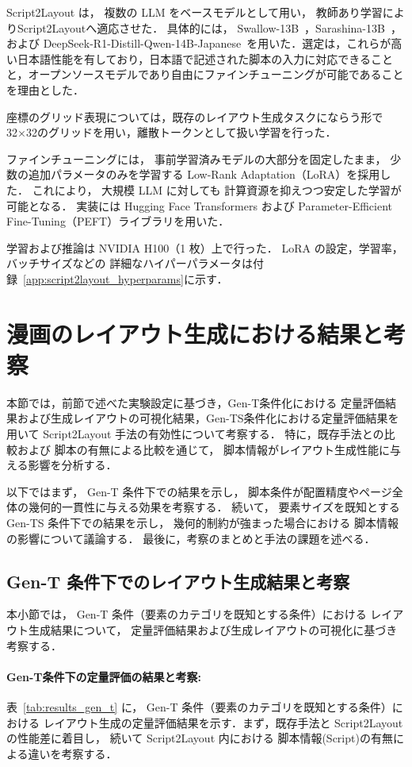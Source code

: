 \documentclass[a4j,12pt,dvipdfmx]{jsreport}
\begin{document}
Script2Layout は，
複数の LLM をベースモデルとして用い，
教師あり学習によりScript2Layoutへ適応させた．
具体的には，
Swallow-13B~\cite{fujii2024swallow}，Sarashina-13B~\cite{sarashina13b}，
および DeepSeek-R1-Distill-Qwen-14B-Japanese~\cite{deepseek2024r1,bai2023qwen}を用いた．選定は，これらが高い日本語性能を有しており，日本語で記述された脚本の入力に対応できることと，オープンソースモデルであり自由にファインチューニングが可能であることを理由とした．

座標のグリッド表現については，既存のレイアウト生成タスクにならう形で32×32のグリッドを用い，離散トークンとして扱い学習を行った．

ファインチューニングには，
事前学習済みモデルの大部分を固定したまま，
少数の追加パラメータのみを学習する
Low-Rank Adaptation（LoRA）を採用した．
これにより，
大規模 LLM に対しても
計算資源を抑えつつ安定した学習が可能となる．
実装には Hugging Face Transformers および
Parameter-Efficient Fine-Tuning（PEFT）ライブラリを用いた．

学習および推論は NVIDIA H100（1 枚）上で行った．
LoRA の設定，学習率，バッチサイズなどの
詳細なハイパーパラメータは付録~\ref{app:script2layout_hyperparams}に示す．

\section{漫画のレイアウト生成における結果と考察}\label{sec:results}

本節では，前節で述べた実験設定に基づき，Gen-T条件化における
定量評価結果および生成レイアウトの可視化結果，Gen-TS条件化における定量評価結果を用いて
Script2Layout 手法の有効性について考察する．
特に，既存手法との比較および
脚本の有無による比較を通じて，
脚本情報がレイアウト生成性能に与える影響を分析する．

以下ではまず，
Gen-T 条件下での結果を示し，
脚本条件が配置精度やページ全体の幾何的一貫性に与える効果を考察する．
続いて，
要素サイズを既知とする Gen-TS 条件下での結果を示し，
幾何的制約が強まった場合における
脚本情報の影響について議論する．
最後に，考察のまとめと手法の課題を述べる．

\subsection{Gen-T 条件下でのレイアウト生成結果と考察}
本小節では，
Gen-T 条件（要素のカテゴリを既知とする条件）における
レイアウト生成結果について，
定量評価結果および生成レイアウトの可視化に基づき考察する．

\paragraph{Gen-T条件下の定量評価の結果と考察: }
表~\ref{tab:results_gen_t} に，
Gen-T 条件（要素のカテゴリを既知とする条件）における
レイアウト生成の定量評価結果を示す．まず，既存手法と Script2Layout の性能差に着目し，
続いて Script2Layout 内における
脚本情報(Script)の有無による違いを考察する．
\end{document}
